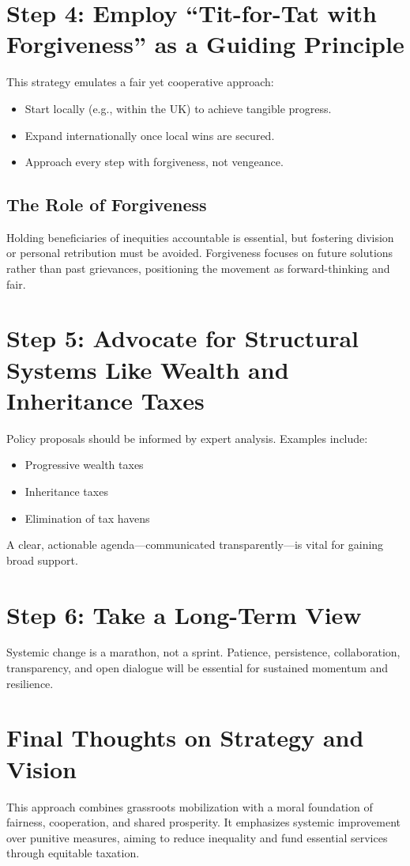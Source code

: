 \documentclass[11pt,a4paper]{article}
\begin{document}
\section{Step 4: Employ ``Tit-for-Tat with Forgiveness'' as a Guiding Principle}
This strategy emulates a fair yet cooperative approach:
\begin{itemize}
  \item Start locally (e.g., within the UK) to achieve tangible progress.
  \item Expand internationally once local wins are secured.
  \item Approach every step with forgiveness, not vengeance.
\end{itemize}

\subsection{The Role of Forgiveness}
Holding beneficiaries of inequities accountable is essential, but fostering division or personal retribution must be avoided. Forgiveness focuses on future solutions rather than past grievances, positioning the movement as forward-thinking and fair.

\section{Step 5: Advocate for Structural Systems Like Wealth and Inheritance Taxes}
Policy proposals should be informed by expert analysis. Examples include:
\begin{itemize}
  \item Progressive wealth taxes
  \item Inheritance taxes
  \item Elimination of tax havens
\end{itemize}
A clear, actionable agenda—communicated transparently—is vital for gaining broad support.

\section{Step 6: Take a Long-Term View}
Systemic change is a marathon, not a sprint. Patience, persistence, collaboration, transparency, and open dialogue will be essential for sustained momentum and resilience.

\section{Final Thoughts on Strategy and Vision}
This approach combines grassroots mobilization with a moral foundation of fairness, cooperation, and shared prosperity. It emphasizes systemic improvement over punitive measures, aiming to reduce inequality and fund essential services through equitable taxation.
\end{document}
